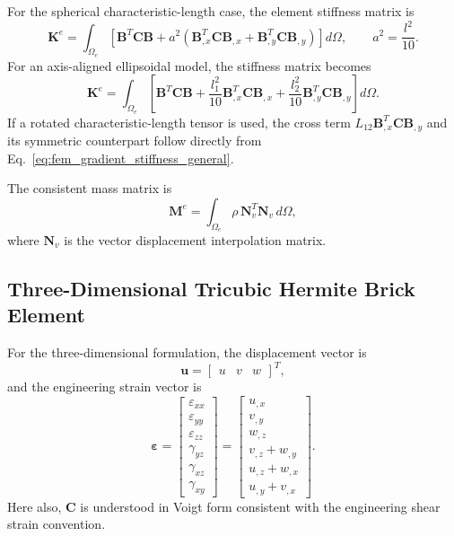 \documentclass[final,3p,times,fleqn]{elsarticle}
\begin{document}
For the spherical characteristic-length case, the element stiffness matrix is
\begin{equation}
\label{eq:2d_bfs_stiffness_isotropic}
\mathbf{K}^{e}
=
\int_{\Omega_e}
\left[
\mathbf{B}^{T}\mathbf{C}\mathbf{B}
+
a^2
\left(
\mathbf{B}_{,x}^{T}\mathbf{C}\mathbf{B}_{,x}
+
\mathbf{B}_{,y}^{T}\mathbf{C}\mathbf{B}_{,y}
\right)
\right]d\Omega,
\qquad
a^2=\frac{l^2}{10}.
\end{equation}
For an axis-aligned ellipsoidal model, the stiffness matrix becomes
\begin{equation}
\label{eq:2d_bfs_stiffness_anisotropic}
\mathbf{K}^{e}
=
\int_{\Omega_e}
\left[
\mathbf{B}^{T}\mathbf{C}\mathbf{B}
+
\frac{l_1^2}{10}
\mathbf{B}_{,x}^{T}\mathbf{C}\mathbf{B}_{,x}
+
\frac{l_2^2}{10}
\mathbf{B}_{,y}^{T}\mathbf{C}\mathbf{B}_{,y}
\right]d\Omega .
\end{equation}
If a rotated characteristic-length tensor is used, the cross term
$L_{12}\mathbf{B}_{,x}^{T}\mathbf{C}\mathbf{B}_{,y}$ and its symmetric
counterpart follow directly from Eq.~\eqref{eq:fem_gradient_stiffness_general}.

The consistent mass matrix is
\begin{equation}
\label{eq:2d_bfs_mass}
\mathbf{M}^{e}
=
\int_{\Omega_e}
\rho\,\mathbf{N}_v^T\mathbf{N}_v\,d\Omega ,
\end{equation}
where $\mathbf{N}_v$ is the vector displacement interpolation matrix.

\subsection{Three-Dimensional Tricubic Hermite Brick Element}
\label{subsec:three_dimensional_hermite_element}

For the three-dimensional formulation, the displacement vector is
\begin{equation}
\label{eq:3d_displacement}
\mathbf{u}
=
\begin{bmatrix}
u & v & w
\end{bmatrix}^{T},
\end{equation}
and the engineering strain vector is
\begin{equation}
\label{eq:3d_fem_strain_vector}
\boldsymbol{\varepsilon}
=
\begin{bmatrix}
\varepsilon_{xx} \\
\varepsilon_{yy} \\
\varepsilon_{zz} \\
\gamma_{yz} \\
\gamma_{xz} \\
\gamma_{xy}
\end{bmatrix}
=
\begin{bmatrix}
u_{,x} \\
v_{,y} \\
w_{,z} \\
v_{,z}+w_{,y} \\
u_{,z}+w_{,x} \\
u_{,y}+v_{,x}
\end{bmatrix}.
\end{equation}
Here also, $\mathbf{C}$ is understood in Voigt form consistent with the
engineering shear strain convention.
\end{document}
